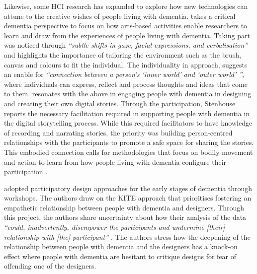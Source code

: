 Likewise, some HCI research has expanded to explore how new technologies can attune to the creative wishes of people living with dementia. \cite{lazar_critical_2017} takes a critical dementia perspective to focus on how arts-based activities enable researchers to learn and draw from the experiences of people living with dementia. Taking part was noticed through \textit{``subtle shifts in gaze, facial expressions, and verbalisation''} and highlights the importance of tailoring the environment such as the brush, canvas and colours to fit the individual. The individuality in approach, suggests an enable for \textit{``connection between a person's `inner world' and `outer world' ''}, where individuals can express, reflect and process thoughts and ideas that come to them. \cite{stenhouse2013dangling} resonates with the above in engaging people with dementia in designing and creating their own digital stories. Through the participation, Stenhouse reports the necessary facilitation required in supporting people with dementia in the digital storytelling process. While this required facilitators to have knowledge of recording and narrating stories, the priority was building person-centred relationships with the participants to promote a safe space for sharing the stories. This embodied connection calls for methodologies that focus on bodily movement and action to learn from how people living with dementia configure their participation \citep{morrissey_creative_2015}.


\cite{lindsay_empathy_2012} adopted participatory design approaches for the early stages of dementia through workshops. The authors draw on the KITE approach that prioritises fostering an empathetic relationship between people with dementia and designers. Through this project, the authors share uncertainty about how their analysis of the data  \textit{``could, inadvertently, disempower the participants and undermine [their] relationship with [the] participant'' \citep[pg.528]{lindsay_empathy_2012}}. The authors stress how the deepening of the relationship between people with dementia and the designers has a knock-on effect where people with dementia are hesitant to critique designs for fear of offending one of the designers.

